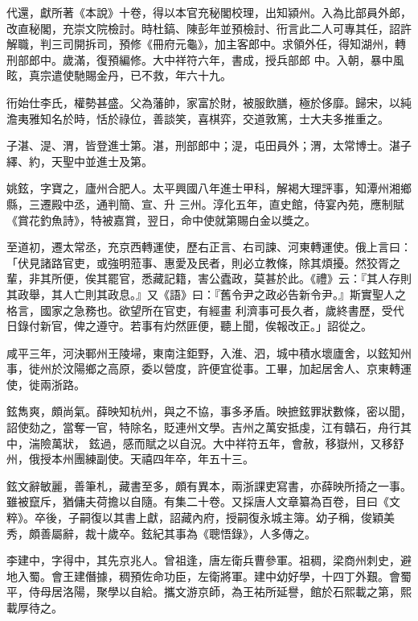 \begin{pinyinscope}
 代還，獻所著《本說》十卷，得以本官充秘閣校理，出知潁州。入為比部員外郎，改直秘閣，充崇文院檢討。時杜鎬、陳彭年並預檢討、衎言此二人可專其任，詔許解職，判三司開拆司，預修《冊府元龜》，加主客郎中。求領外任，得知湖州，轉刑部郎中。歲滿，復預編修。大中祥符六年，書成，授兵部郎
 中。入朝，暴中風眩，真宗遣使馳賜金丹，已不救，年六十九。



 衎始仕李氏，權勢甚盛。父為藩帥，家富於財，被服飲膳，極於侈靡。歸宋，以純澹夷雅知名於時，恬於祿位，善談笑，喜棋弈，交道敦篤，士大夫多推重之。



 子湛、湜、渭，皆登進士第。湛，刑部郎中；湜，屯田員外；渭，太常博士。湛子繹、約，天聖中並進士及第。



 姚鉉，字寶之，廬州合肥人。太平興國八年進士甲科，解褐大理評事，知潭州湘鄉縣，三遷殿中丞，通判簡、宣、升
 三州。淳化五年，直史館，侍宴內苑，應制賦《賞花釣魚詩》，特被嘉賞，翌日，命中使就第賜白金以獎之。



 至道初，遷太常丞，充京西轉運使，歷右正言、右司諫、河東轉運使。俄上言曰：「伏見諸路官吏，或強明蒞事、惠愛及民者，則必立教條，除其煩擾。然狡胥之輩，非其所便，俟其罷官，悉藏記籍，害公蠹政，莫甚於此。《禮》云：『其人存則其政舉，其人亡則其政息。』又《語》曰：『舊令尹之政必告新令尹。』斯實聖人之格言，國家之急務也。欲望所在官吏，有經畫
 利濟事可長久者，歲終書歷，受代日錄付新官，俾之遵守。若事有灼然匪便，聽上聞，俟報改正。」詔從之。



 咸平三年，河決鄆州王陵埽，東南注鉅野，入淮、泗，城中積水壞廬舍，以鉉知州事，徙州於汶陽鄉之高原，委以營度，許便宜從事。工畢，加起居舍人、京東轉運使，徙兩浙路。



 鉉雋爽，頗尚氣。薛映知杭州，與之不協，事多矛盾。映摭鉉罪狀數條，密以聞，詔使劾之，當奪一官，特除名，貶連州文學。吉州之萬安抵虔，江有贛石，舟行其中，湍險萬狀，
 鉉過，感而賦之以自況。大中祥符五年，會赦，移嶽州，又移舒州，俄授本州團練副使。天禧四年卒，年五十三。



 鉉文辭敏麗，善筆札，藏書至多，頗有異本，兩浙課吏寫書，亦薛映所掎之一事。雖被竄斥，猶傭夫荷擔以自隨。有集二十卷。又採唐人文章纂為百卷，目曰《文粹》。卒後，子嗣復以其書上獻，詔藏內府，授嗣復永城主簿。幼子稱，俊穎美秀，頗善屬辭，裁十歲卒。鉉紀其事為《聰悟錄》，人多傳之。



 李建中，字得中，其先京兆人。曾祖逢，唐左衛兵曹參軍。祖稠，梁商州刺史，避地入蜀。會王建僭據，稠預佐命功臣，左衛將軍。建中幼好學，十四丁外艱。會蜀平，侍母居洛陽，聚學以自給。攜文游京師，為王祐所延譽，館於石熙載之第，熙載厚待之。




\end{pinyinscope}
